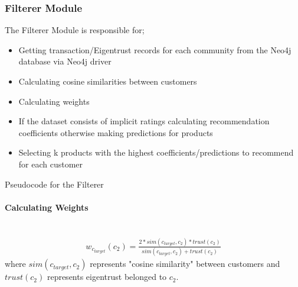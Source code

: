 	\subsubsection{Filterer Module} The Filterer Module is responsible for;
	\begin{itemize}
		\item Getting transaction/Eigentrust records for each community from the Neo4j database via Neo4j driver
		\item Calculating cosine similarities between customers
		\item Calculating weights
		\item If the dataset consists of implicit ratings calculating recommendation coefficients otherwise making predictions for products
		\item Selecting k products with the highest coefficients/predictions to recommend for each customer
	\end{itemize}
	{
		\center
		\begin{algorithm}[H]
			\NoCaptionOfAlgo
			\SetAlgoLined
			\caption{Pseudocode for the Filterer}
		\end{algorithm}
	}

	\paragraph{Calculating Weights} \mbox{}\\
	\begin{equation*} 
	\begin{split}
	w_{c_{target}}(c_{2}) = \frac{2*sim(c_{target},c_{2})*trust(c_{2})}{sim(c_{target},c_{2})+trust(c_{2})}
	\end{split}
	\end{equation*}
	where $sim(c_{target},c_{2})$ represents "cosine similarity" between customers and $trust(c_{2})$ represents eigentrust belonged to $c_{2}$.

